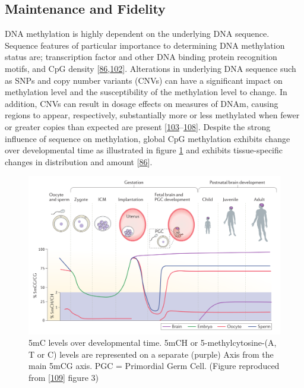 \documentclass[
]{book}
\begin{document}
\hypertarget{maintenance-and-fidelity}{%
\subsection{Maintenance and Fidelity}\label{maintenance-and-fidelity}}

DNA methylation is highly dependent on the underlying DNA sequence.
Sequence features of particular importance to determining DNA methylation status are; transcription factor and other DNA binding protein recognition motifs, and CpG density {[}\protect\hyperlink{ref-Ziller2013}{86},\protect\hyperlink{ref-Lienert2011}{102}{]}.
Alterations in underlying DNA sequence such as SNPs and copy number variants (CNVs) can have a significant impact on methylation level and the susceptibility of the methylation level to change.
In addition, CNVs can result in dosage effects on measures of DNAm, causing regions to appear, respectively, substantially more or less methylated when fewer or greater copies than expected are present {[}\protect\hyperlink{ref-Boks2009}{103}--\protect\hyperlink{ref-Martin-Trujillo2017}{108}{]}.
Despite the strong influence of sequence on methylation, global CpG methylation exhibits change over developmental time as illustrated in figure \ref{fig:DNAmDevTime} and exhibits tissue-specific changes in distribution and amount {[}\protect\hyperlink{ref-Ziller2013}{86}{]}.

\begin{figure}

{\centering \includegraphics[width=0.8\linewidth]{figs/Ciernia2016f3DNAmTime} 

}

\caption{5mC levels over developmental time. 5mCH or 5-methylcytosine-(A, T or C) levels are represented on a separate (purple) Axis from the main 5mCG axis. PGC = Primordial Germ Cell. (Figure reproduced from {[}\protect\hyperlink{ref-Ciernia2016}{109}{]} figure 3)}\label{fig:DNAmDevTime}
\end{figure}
\end{document}

